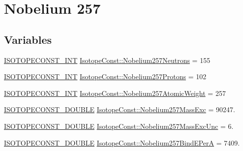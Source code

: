 \hypertarget{group___isotope_const-_nobelium-_no257}{}\section{Nobelium 257}
\label{group___isotope_const-_nobelium-_no257}
\subsection*{Variables}
\begin{DoxyCompactItemize}
\item 
\mbox{\hyperlink{group___isotope_const-_macros_ga5f18360b3e99483a35c32d789e62621c}{I\+S\+O\+T\+O\+P\+E\+C\+O\+N\+S\+T\+\_\+\+I\+NT}} \mbox{\hyperlink{group___isotope_const-_nobelium-_no257_gab94cd6c9f5c102bfc9474bbccd1d37cd}{Isotope\+Const\+::\+Nobelium257\+Neutrons}} = 155
\item 
\mbox{\hyperlink{group___isotope_const-_macros_ga5f18360b3e99483a35c32d789e62621c}{I\+S\+O\+T\+O\+P\+E\+C\+O\+N\+S\+T\+\_\+\+I\+NT}} \mbox{\hyperlink{group___isotope_const-_nobelium-_no257_ga6683a39201b60889304a36c050873f51}{Isotope\+Const\+::\+Nobelium257\+Protons}} = 102
\item 
\mbox{\hyperlink{group___isotope_const-_macros_ga5f18360b3e99483a35c32d789e62621c}{I\+S\+O\+T\+O\+P\+E\+C\+O\+N\+S\+T\+\_\+\+I\+NT}} \mbox{\hyperlink{group___isotope_const-_nobelium-_no257_gabf2401210fc2e359451019477a78ec0c}{Isotope\+Const\+::\+Nobelium257\+Atomic\+Weight}} = 257
\item 
\mbox{\hyperlink{group___isotope_const-_macros_ga8f45a7272ce02c0b4c65c44636ed719a}{I\+S\+O\+T\+O\+P\+E\+C\+O\+N\+S\+T\+\_\+\+D\+O\+U\+B\+LE}} \mbox{\hyperlink{group___isotope_const-_nobelium-_no257_gac8457fe8044afdd7a013508c1847619a}{Isotope\+Const\+::\+Nobelium257\+Mass\+Exc}} = 90247.
\item 
\mbox{\hyperlink{group___isotope_const-_macros_ga8f45a7272ce02c0b4c65c44636ed719a}{I\+S\+O\+T\+O\+P\+E\+C\+O\+N\+S\+T\+\_\+\+D\+O\+U\+B\+LE}} \mbox{\hyperlink{group___isotope_const-_nobelium-_no257_ga3e30ec08e34176840f9b5089080fa41f}{Isotope\+Const\+::\+Nobelium257\+Mass\+Exc\+Unc}} = 6.
\item 
\mbox{\hyperlink{group___isotope_const-_macros_ga8f45a7272ce02c0b4c65c44636ed719a}{I\+S\+O\+T\+O\+P\+E\+C\+O\+N\+S\+T\+\_\+\+D\+O\+U\+B\+LE}} \mbox{\hyperlink{group___isotope_const-_nobelium-_no257_ga35a03205590499921c82b46e868e94e8}{Isotope\+Const\+::\+Nobelium257\+Bind\+E\+PerA}} = 7409.
\item 

\end{DoxyCompactItemize}

